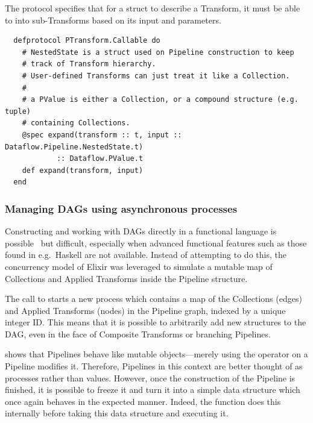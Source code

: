 \begin{codelisting}
	\caption[The definition of the  protocol.]{The  protocol specifies that for a struct to describe a Transform, it must be able to  into sub-Transforms based on its input and parameters.}
	\label{lst:impl:ptransform-callable}
	\begin{verbatim}
  defprotocol PTransform.Callable do
    # NestedState is a struct used on Pipeline construction to keep
    # track of Transform hierarchy.
    # User-defined Transforms can just treat it like a Collection.
    # 
    # a PValue is either a Collection, or a compound structure (e.g. tuple)
    # containing Collections.
    @spec expand(transform :: t, input :: Dataflow.Pipeline.NestedState.t)
            :: Dataflow.PValue.t
    def expand(transform, input)
  end
	\end{verbatim}
	
\end{codelisting}


\subsubsection{Managing DAGs using asynchronous processes}

Constructing and working with DAGs directly in a functional language is possible~\cite{Gibbons1995} but difficult, especially when advanced functional features such as those found in e.g.\ Haskell are not available.
Instead of attempting to do this, the concurrency model of Elixir was leveraged to simulate a mutable map of Collections and Applied Transforms inside the Pipeline structure.

The call to  starts a new process which contains a map of the Collections (edges) and Applied Transforms (nodes) in the Pipeline graph, indexed by a unique integer ID.
This means that it is possible to arbitrarily add new structures to the DAG, even in the face of Composite Transforms or branching Pipelines.

 shows that Pipelines behave like mutable objects---merely using the \exs{~>} operator on a Pipeline modifies it.
Therefore, Pipelines in this context are better thought of as processes rather than values.
However, once the construction of the Pipeline is finished, it is possible to freeze it and turn it into a simple data structure which once again behaves in the expected manner.
Indeed, the  function does this internally before taking this data structure and executing it.

